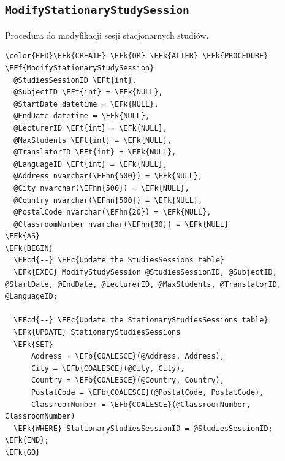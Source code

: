 \documentclass[11pt]{article}
\newcommand{\EFc}[1]{\textcolor{EFc}{\textit{#1}}} %
\newcommand{\EFcd}[1]{\textcolor{EFcd}{\textit{#1}}} %
\newcommand{\EFk}[1]{\textcolor{EFk}{\textbf{#1}}} %
\newcommand{\EFb}[1]{\textcolor{EFb}{\textbf{#1}}} %
\newcommand{\EFf}[1]{\textcolor{EFf}{#1}} %
\newcommand{\EFt}[1]{\textcolor{EFt}{\textbf{#1}}} %
\newcommand{\EFhn}[1]{\textcolor{EFhn}{#1}} %
\begin{document}
\subsection{\texttt{ModifyStationaryStudySession}}
\label{sec:org3acded0}
Procedura do modyfikacji sesji stacjonarnych studiów.
\begin{Code}
\begin{Verbatim}
\color{EFD}\EFk{CREATE} \EFk{OR} \EFk{ALTER} \EFk{PROCEDURE} \EFf{ModifyStationaryStudySession}
  @StudiesSessionID \EFt{int},
  @SubjectID \EFt{int} = \EFk{NULL},
  @StartDate datetime = \EFk{NULL},
  @EndDate datetime = \EFk{NULL},
  @LecturerID \EFt{int} = \EFk{NULL},
  @MaxStudents \EFt{int} = \EFk{NULL},
  @TranslatorID \EFt{int} = \EFk{NULL},
  @LanguageID \EFt{int} = \EFk{NULL},
  @Address nvarchar(\EFhn{500}) = \EFk{NULL},
  @City nvarchar(\EFhn{500}) = \EFk{NULL},
  @Country nvarchar(\EFhn{500}) = \EFk{NULL},
  @PostalCode nvarchar(\EFhn{20}) = \EFk{NULL},
  @ClassroomNumber nvarchar(\EFhn{30}) = \EFk{NULL}
\EFk{AS}
\EFk{BEGIN}
  \EFcd{--} \EFc{Update the StudiesSessions table}
  \EFk{EXEC} ModifyStudySession @StudiesSessionID, @SubjectID, @StartDate, @EndDate, @LecturerID, @MaxStudents, @TranslatorID, @LanguageID;

  \EFcd{--} \EFc{Update the StationaryStudiesSessions table}
  \EFk{UPDATE} StationaryStudiesSessions
  \EFk{SET}
      Address = \EFb{COALESCE}(@Address, Address),
      City = \EFb{COALESCE}(@City, City),
      Country = \EFb{COALESCE}(@Country, Country),
      PostalCode = \EFb{COALESCE}(@PostalCode, PostalCode),
      ClassroomNumber = \EFb{COALESCE}(@ClassroomNumber, ClassroomNumber)
  \EFk{WHERE} StationaryStudiesSessionID = @StudiesSessionID;
\EFk{END};
\EFk{GO}
\end{Verbatim}
\end{Code}
\end{document}
